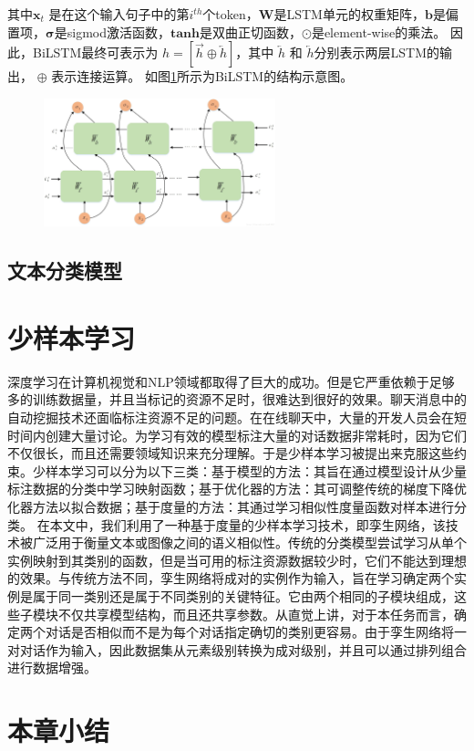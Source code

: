 其中$\mathbf{x}_{t}$ 是在这个输入句子中的第$i^{th}$个token，$\mathbf{W}$是LSTM单元的权重矩阵，$\mathbf{b}$是偏置项，$\mathbf{\sigma}$是sigmod激活函数，$\mathbf{tanh}$是双曲正切函数，$\odot$是element-wise的乘法。
因此，BiLSTM最终可表示为 $h=[\overrightarrow{h}\oplus \overleftarrow{h}]$，其中 $ \overleftarrow{h}$ 和  $ \overleftarrow{h}$分别表示两层LSTM的输出， $\oplus$ 表示连接运算。
如图\ref{fig:bilstm}所示为BiLSTM的结构示意图。
\begin{figure}[htbp]
    \centering
    \includegraphics[width=0.6\textwidth]{Img/bilstm.jpg}
    \label{fig:bilstm}
\end{figure}

\subsection{文本分类模型}

\section{少样本学习}
深度学习在计算机视觉和NLP领域都取得了巨大的成功。但是它严重依赖于足够多的训练数据量，并且当标记的资源不足时，很难达到很好的效果。聊天消息中的自动挖掘技术还面临标注资源不足的问题。在在线聊天中，大量的开发人员会在短时间内创建大量讨论。为学习有效的模型标注大量的对话数据非常耗时，因为它们不仅很长，而且还需要领域知识来充分理解。于是少样本学习被提出来克服这些约束\cite{wang2019few}。少样本学习可以分为以下三类\cite{chen2019closer}：基于模型的方法：其旨在通过模型设计从少量标注数据的分类中学习映射函数；基于优化器的方法：其可调整传统的梯度下降优化器方法以拟合数据；基于度量的方法：其通过学习相似性度量函数对样本进行分类。
在本文中，我们利用了一种基于度量的少样本学习技术，即孪生网络\cite{bromley1994signature}，该技术被广泛用于衡量文本或图像之间的语义相似性\cite{mueller2016siamese}。传统的分类模型尝试学习从单个实例映射到其类别的函数，但是当可用的标注资源数据较少时，它们不能达到理想的效果。与传统方法不同，孪生网络将成对的实例作为输入，旨在学习确定两个实例是属于同一类别还是属于不同类别的关键特征。它由两个相同的子模块组成，这些子模块不仅共享模型结构，而且还共享参数。从直觉上讲，对于本任务而言，确定两个对话是否相似而不是为每个对话指定确切的类别更容易。由于孪生网络将一对对话作为输入，因此数据集从元素级别转换为成对级别，并且可以通过排列组合进行数据增强。

\section{本章小结}


